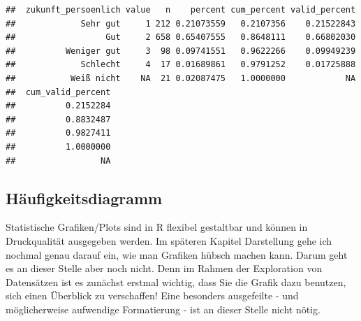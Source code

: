 \documentclass[
]{book}
\newenvironment{Shaded}{\begin{snugshade}}{\end{snugshade}}
\newcommand{\AttributeTok}[1]{\textcolor[rgb]{0.77,0.63,0.00}{#1}}
\newcommand{\CommentTok}[1]{\textcolor[rgb]{0.56,0.35,0.01}{\textit{#1}}}
\newcommand{\FunctionTok}[1]{\textcolor[rgb]{0.00,0.00,0.00}{#1}}
\newcommand{\NormalTok}[1]{#1}
\newcommand{\SpecialCharTok}[1]{\textcolor[rgb]{0.00,0.00,0.00}{#1}}
\newcommand{\StringTok}[1]{\textcolor[rgb]{0.31,0.60,0.02}{#1}}
\begin{document}
\begin{Shaded}
\end{Shaded}

\begin{verbatim}
##  zukunft_persoenlich value   n    percent cum_percent valid_percent
##             Sehr gut     1 212 0.21073559   0.2107356    0.21522843
##                  Gut     2 658 0.65407555   0.8648111    0.66802030
##          Weniger gut     3  98 0.09741551   0.9622266    0.09949239
##             Schlecht     4  17 0.01689861   0.9791252    0.01725888
##           Weiß nicht    NA  21 0.02087475   1.0000000            NA
##  cum_valid_percent
##          0.2152284
##          0.8832487
##          0.9827411
##          1.0000000
##                 NA
\end{verbatim}

\hypertarget{huxe4ufigkeitsdiagramm}{%
\subsection{Häufigkeitsdiagramm}\label{huxe4ufigkeitsdiagramm}}

Statistische Grafiken/Plots sind in R flexibel gestaltbar und können in Druckqualität ausgegeben werden. Im späteren Kapitel Darstellung gehe ich nochmal genau darauf ein, wie man Grafiken hübsch machen kann. Darum geht es an dieser Stelle aber noch nicht. Denn im Rahmen der Exploration von Datensätzen ist es zunächst erstmal wichtig, dass Sie die Grafik dazu benutzen, sich einen Überblick zu verschaffen! Eine besonders ausgefeilte - und möglicherweise aufwendige Formatierung - ist an dieser Stelle nicht nötig.
\end{document}
